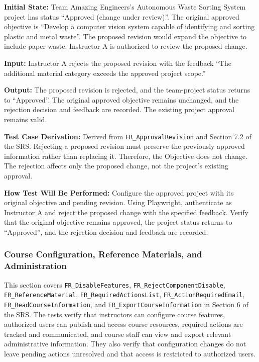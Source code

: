 \documentclass[12pt, titlepage]{article}
\begin{document}
\begin{enumerate}
\textbf{Initial State:} Team Amazing Engineers's Autonomous Waste Sorting System project has status ``Approved (change under review)''. The original approved objective is ``Develop a computer vision system capable of identifying and sorting plastic and metal waste''. The proposed revision would expand the objective to include paper waste. Instructor A is authorized to review the proposed change.

\textbf{Input:} Instructor A rejects the proposed revision with the feedback ``The additional material category exceeds the approved project scope.''

\textbf{Output:} The proposed revision is rejected, and the team-project status returns to ``Approved''. The original approved objective remains unchanged, and the rejection decision and feedback are recorded. The existing project approval remains valid.

\textbf{Test Case Derivation:} Derived from \texttt{FR\_ApprovalRevision} and Section 7.2 of the SRS. Rejecting a proposed revision must preserve the previously approved information rather than replacing it. Therefore, the Objective does not change. The rejection affects only the proposed change, not the project's existing approval.

\textbf{How Test Will Be Performed:} Configure the approved project with its original objective and pending revision. Using Playwright, authenticate as Instructor A and reject the proposed change with the specified feedback. Verify that the original objective remains approved, the project status returns to ``Approved'', and the rejection decision and feedback are recorded.

\end{enumerate}

\subsubsection{Course Configuration, Reference Materials, and Administration}

This section covers \texttt{FR\_DisableFeatures}, \texttt{FR\_RejectComponentDisable}, \texttt{FR\_ReferenceMaterial}, \texttt{FR\_RequiredActionsList}, \texttt{FR\_ActionRequiredEmail}, \texttt{FR\_ReadCourseInformation}, and \texttt{FR\_ExportCourseInformation} in Section 6 of the SRS. The tests verify that instructors can configure course features, authorized users can publish and access course resources, required actions are tracked and communicated, and course staff can view and export relevant administrative information. They also verify that configuration changes do not leave pending actions unresolved and that access is restricted to authorized users.
\end{document}
